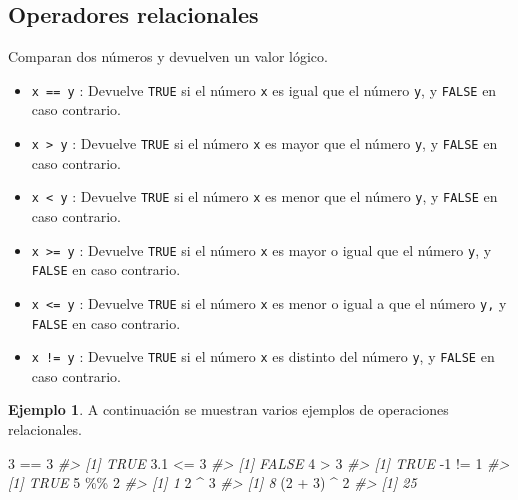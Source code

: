\documentclass[
]{book}
\newenvironment{Shaded}{\begin{snugshade}}{\end{snugshade}}
\newcommand{\CommentTok}[1]{\textcolor[rgb]{0.56,0.35,0.01}{\textit{#1}}}
\newcommand{\DecValTok}[1]{\textcolor[rgb]{0.00,0.00,0.81}{#1}}
\newcommand{\FloatTok}[1]{\textcolor[rgb]{0.00,0.00,0.81}{#1}}
\newcommand{\NormalTok}[1]{#1}
\newcommand{\SpecialCharTok}[1]{\textcolor[rgb]{0.00,0.00,0.00}{#1}}
\providecommand{\tightlist}{%
  \setlength{\itemsep}{0pt}\setlength{\parskip}{0pt}}
\theoremstyle{definition}
\theoremstyle{definition}
\newtheorem{example}{Ejemplo}[chapter]
\theoremstyle{definition}
\theoremstyle{definition}
\theoremstyle{remark}
\begin{document}
\hypertarget{operadores-relacionales}{%
\subsection{Operadores relacionales}\label{operadores-relacionales}}

Comparan dos números y devuelven un valor lógico.

\begin{itemize}
\tightlist
\item
  \texttt{x\ ==\ y} : Devuelve \texttt{TRUE} si el número \texttt{x} es igual que el número \texttt{y}, y \texttt{FALSE} en caso contrario.
\item
  \texttt{x\ \textgreater{}\ y} : Devuelve \texttt{TRUE} si el número \texttt{x} es mayor que el número \texttt{y}, y \texttt{FALSE} en caso contrario.
\item
  \texttt{x\ \textless{}\ y} : Devuelve \texttt{TRUE} si el número \texttt{x} es menor que el número \texttt{y}, y \texttt{FALSE} en caso contrario.
\item
  \texttt{x\ \textgreater{}=\ y} : Devuelve \texttt{TRUE} si el número \texttt{x} es mayor o igual que el número \texttt{y}, y \texttt{FALSE} en caso contrario.
\item
  \texttt{x\ \textless{}=\ y} : Devuelve \texttt{TRUE} si el número \texttt{x} es menor o igual a que el número \texttt{y,} y \texttt{FALSE} en caso contrario.
\item
  \texttt{x\ !=\ y} : Devuelve \texttt{TRUE} si el número \texttt{x} es distinto del número \texttt{y}, y \texttt{FALSE} en caso contrario.
\end{itemize}

\begin{example}

A continuación se muestran varios ejemplos de operaciones relacionales.

\begin{Shaded}
\begin{Highlighting}[]
\DecValTok{3} \SpecialCharTok{==} \DecValTok{3}
\CommentTok{\#\textgreater{} [1] TRUE}
\FloatTok{3.1} \SpecialCharTok{\textless{}=} \DecValTok{3}
\CommentTok{\#\textgreater{} [1] FALSE}
\DecValTok{4} \SpecialCharTok{\textgreater{}} \DecValTok{3}
\CommentTok{\#\textgreater{} [1] TRUE}
\SpecialCharTok{{-}}\DecValTok{1} \SpecialCharTok{!=} \DecValTok{1}
\CommentTok{\#\textgreater{} [1] TRUE}
\DecValTok{5} \SpecialCharTok{\%\%} \DecValTok{2}
\CommentTok{\#\textgreater{} [1] 1}
\DecValTok{2} \SpecialCharTok{\^{}} \DecValTok{3}
\CommentTok{\#\textgreater{} [1] 8}
\NormalTok{(}\DecValTok{2} \SpecialCharTok{+} \DecValTok{3}\NormalTok{) }\SpecialCharTok{\^{}} \DecValTok{2}
\CommentTok{\#\textgreater{} [1] 25}
\end{Highlighting}
\end{Shaded}

\end{example}
\end{document}
